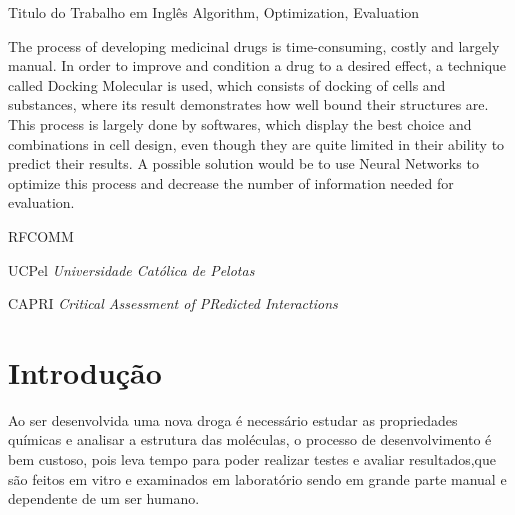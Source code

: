 \documentclass[tcc, capa]{texucpel}
\begin{document}
\begin{abstract}
O processo de desenvolvimento de drogas medicinais é demorado,custoso e em grande parte manual.
Para melhorar e condicionar uma droga a um efeito desejado, utiliza-se uma técnica chamada Docking Molecular, que consiste em realizar atracamento de células e substâncias,onde o seu resultado demonstra o quão bem ligadas suas estruturas estão.Este processo é feito em grande parte por softwares, que exibem a melhor opção e combinações no design das células, ainda que estejam bem limitados em sua capacidade de predizer seus resultados.Uma possível solução seria utilizar Redes Neurais para otimizar este processo e diminuir o número de informações necessárias passadas para avaliação.
\end{abstract}

\begin{englishabstract}
  {Titulo do Trabalho em Inglês}
  {Algorithm, Optimization, Evaluation}  
  
The process of developing medicinal drugs is time-consuming, costly and largely manual.
In order to improve and condition a drug to a desired effect, a technique called Docking Molecular is used, which consists of docking of cells and substances, where its result demonstrates how well bound their structures are. \\
This process is largely done by softwares, which display the best choice and combinations in cell design, even though they are quite limited in their ability to predict their results.
A possible solution would be to use Neural Networks to optimize this process and decrease the number of information needed for evaluation.

\end{englishabstract}

\listoffigures

\listoftables

\begin{listofabbrv}{RFCOMM}
		\item[UCPel] \textit{Universidade Cat\'olica de Pelotas}
        \item[CAPRI] \textit{Critical Assessment of PRedicted Interactions}

        
        
\end{listofabbrv}

\tableofcontents

\chapter{Introdução}
Ao ser desenvolvida uma nova droga é necessário estudar as propriedades químicas e analisar a estrutura das moléculas, o processo de desenvolvimento é bem custoso, pois leva tempo para poder realizar testes e avaliar resultados,que são feitos em vitro e examinados em laboratório sendo em grande parte manual e dependente de um ser humano.%
\end{document}
